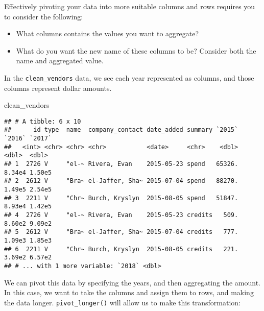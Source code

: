 \documentclass[
]{book}
\newenvironment{Shaded}{\begin{snugshade}}{\end{snugshade}}
\newcommand{\CommentTok}[1]{\textcolor[rgb]{0.56,0.35,0.01}{\textit{#1}}}
\newcommand{\DataTypeTok}[1]{\textcolor[rgb]{0.13,0.29,0.53}{#1}}
\newcommand{\KeywordTok}[1]{\textcolor[rgb]{0.13,0.29,0.53}{\textbf{#1}}}
\newcommand{\NormalTok}[1]{#1}
\newcommand{\OperatorTok}[1]{\textcolor[rgb]{0.81,0.36,0.00}{\textbf{#1}}}
\newcommand{\StringTok}[1]{\textcolor[rgb]{0.31,0.60,0.02}{#1}}
\providecommand{\tightlist}{%
  \setlength{\itemsep}{0pt}\setlength{\parskip}{0pt}}
\begin{document}
Effectively pivoting your data into more suitable columns and rows requires you to consider the following:

\begin{itemize}
\tightlist
\item
  What columns contains the values you want to aggregate?
\item
  What do you want the new name of these columns to be? Consider both the name and aggregated value.
\end{itemize}

In the \texttt{clean\_vendors} data, we see each year represented as columns, and those columns represent dollar amounts.

\begin{Shaded}
\begin{Highlighting}[]
\NormalTok{clean_vendors}
\end{Highlighting}
\end{Shaded}

\begin{verbatim}
## # A tibble: 6 x 10
##      id type  name  company_contact date_added summary `2015` `2016` `2017`
##   <int> <chr> <chr> <chr>           <date>     <chr>    <dbl>  <dbl>  <dbl>
## 1  2726 V     "el-~ Rivera, Evan    2015-05-23 spend   65326. 8.34e4 1.50e5
## 2  2612 V     "Bra~ el-Jaffer, Sha~ 2015-07-04 spend   88270. 1.49e5 2.54e5
## 3  2211 V     "Chr~ Burch, Kryslyn  2015-08-05 spend   51847. 8.93e4 1.42e5
## 4  2726 V     "el-~ Rivera, Evan    2015-05-23 credits   509. 8.60e2 9.09e2
## 5  2612 V     "Bra~ el-Jaffer, Sha~ 2015-07-04 credits   777. 1.09e3 1.85e3
## 6  2211 V     "Chr~ Burch, Kryslyn  2015-08-05 credits   221. 3.69e2 6.57e2
## # ... with 1 more variable: `2018` <dbl>
\end{verbatim}

We can pivot this data by specifying the years, and then aggregating the amount. In this case, we want to take the columns and assign them to rows, and making the data longer. \texttt{pivot\_longer()} will allow us to make this transformation:

\begin{Shaded}
\end{Shaded}
\end{document}

